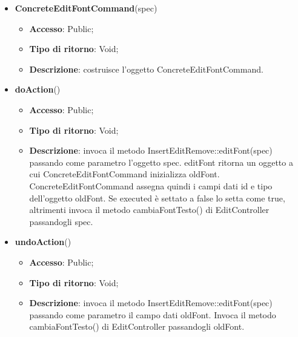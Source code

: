 {{{\begin{itemize}
\begin{itemize}
\begin{itemize}
		\end{itemize}
			\end{itemize}
			\end{itemize}
		\begin{itemize}
			\item \textbf{ConcreteEditFontCommand}(spec)
			\begin{itemize}
				\item \textbf{Accesso}: Public;
				\item \textbf{Tipo di ritorno}: Void;
				\item \textbf{Descrizione}: costruisce l’oggetto ConcreteEditFontCommand.
			\end{itemize}
			\item \textbf{doAction}()
			\begin{itemize}
				\item \textbf{Accesso}: Public;
				\item \textbf{Tipo di ritorno}: Void;
				\item \textbf{Descrizione}: invoca il metodo InsertEditRemove::editFont(spec) passando come parametro l'oggetto spec. editFont ritorna un oggetto a cui ConcreteEditFontCommand inizializza oldFont. ConcreteEditFontCommand assegna quindi i campi dati id e tipo dell'oggetto oldFont. Se executed è settato a false lo setta come true, altrimenti invoca il metodo cambiaFontTesto() di EditController passandogli spec.
			\end{itemize}
			\item \textbf{undoAction}()
			\begin{itemize}
				\item \textbf{Accesso}: Public;
				\item \textbf{Tipo di ritorno}: Void;
				\item \textbf{Descrizione}: invoca il metodo InsertEditRemove::editFont(spec) passando come parametro il campo dati oldFont. Invoca il metodo cambiaFontTesto() di EditController passandogli oldFont.
			\end{itemize}
		\end{itemize}
}

}}
